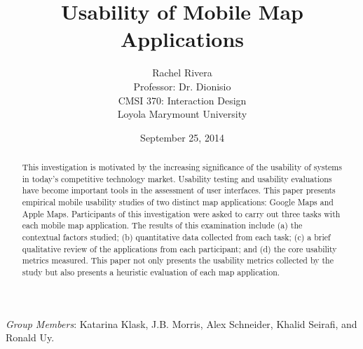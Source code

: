 \documentclass[a4paper; 11pt]{article}
\begin{document}
\title{Usability of Mobile Map Applications}

\author{Rachel Rivera\\
Professor: Dr. Dionisio\\
CMSI 370: Interaction Design\\
  Loyola Marymount University}

\date{September 25, 2014}


\renewcommand{\thefootnote}{\fnsymbol{footnote}}




\maketitle

\vspace{-.2in}
\begin{center}
\begin{abstract}
\noindent This investigation is motivated by the increasing significance of the usability of systems in today's competitive technology market. Usability testing and usability evaluations have become important tools in the assessment of user interfaces. This paper presents empirical mobile usability studies of two distinct map applications: Google Maps and Apple Maps. Participants of this investigation were asked to carry out three tasks with each mobile map application. The results of this examination include (a) the contextual factors studied; (b) quantitative data collected from each task; (c) a brief qualitative review of the applications from each participant; and (d) the core usability metrics measured. This paper not only presents the usability metrics collected by the study but also presents a heuristic evaluation of each map application.
\end{abstract}
\end{center}

\medskip
\medskip


\medskip
\noindent \textit{Group Members}: Katarina Klask, J.B. Morris, Alex Schneider, Khalid Seirafi, and Ronald Uy.

\thispagestyle{empty}

\clearpage

\setcounter{footnote}{0}
\renewcommand{\thefootnote}{\arabic{footnote}}
\setcounter{page}{1}
\end{document}
